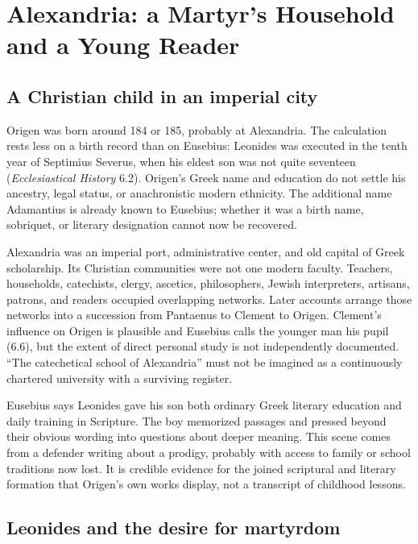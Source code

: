 \section{Alexandria: a Martyr's Household and a Young Reader}
\label{sec:origen-alexandria}

\subsection{A Christian child in an imperial city}

Origen was born around 184 or 185, probably at Alexandria. The calculation
rests less on a birth record than on Eusebius: Leonides was executed in the
tenth year of Septimius Severus, when his eldest son was not quite seventeen
(\emph{Ecclesiastical History} 6.2). Origen's Greek name and education do not
settle his ancestry, legal status, or anachronistic modern ethnicity. The
additional name Adamantius is already known to Eusebius; whether it was a
birth name, sobriquet, or literary designation cannot now be recovered.

Alexandria was an imperial port, administrative center, and old capital of
Greek scholarship. Its Christian communities were not one modern faculty.
Teachers, households, catechists, clergy, ascetics, philosophers, Jewish
interpreters, artisans, patrons, and readers occupied overlapping networks.
Later accounts arrange those networks into a succession from Pantaenus to
Clement to Origen. Clement's influence on Origen is plausible and Eusebius
calls the younger man his pupil (6.6), but the extent of direct personal study
is not independently documented. ``The catechetical school of Alexandria''
must not be imagined as a continuously chartered university with a surviving
register.

Eusebius says Leonides gave his son both ordinary Greek literary education and
daily training in Scripture. The boy memorized passages and pressed beyond
their obvious wording into questions about deeper meaning. This scene comes
from a defender writing about a prodigy, probably with access to family or
school traditions now lost. It is credible evidence for the joined scriptural
and literary formation that Origen's own works display, not a transcript of
childhood lessons.

\subsection{Leonides and the desire for martyrdom}

